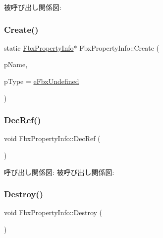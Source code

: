 被呼び出し関係図\+:
\mbox{\label{class_fbx_property_info_a8cf0ec9c51968ff02688038fe93de49a}} 
\subsubsection{\texorpdfstring{Create()}{Create()}\hspace{0.1cm}{\footnotesize\ttfamily [2/2]}}
{\footnotesize\ttfamily static \hyperlink{class_fbx_property_info}{Fbx\+Property\+Info}$\ast$ Fbx\+Property\+Info\+::\+Create (\begin{DoxyParamCaption}\item[{const char $\ast$}]{p\+Name,  }\item[{\hyperlink{fbxpropertytypes_8h_a73913a5ddfb20e57c6f25e9e6784bd92}{E\+Fbx\+Type}}]{p\+Type = {\ttfamily \hyperlink{fbxpropertytypes_8h_a73913a5ddfb20e57c6f25e9e6784bd92a150b400dddd0f8b5c7e22a1bba0721d8}{e\+Fbx\+Undefined}} }\end{DoxyParamCaption})\hspace{0.3cm}{\ttfamily [static]}}

\mbox{\label{class_fbx_property_info_abea3d3ce25a205502657711eb7e2c6f2}} 
\subsubsection{\texorpdfstring{Dec\+Ref()}{DecRef()}}
{\footnotesize\ttfamily void Fbx\+Property\+Info\+::\+Dec\+Ref (\begin{DoxyParamCaption}{ }\end{DoxyParamCaption})}

呼び出し関係図\+:
被呼び出し関係図\+:
\mbox{\label{class_fbx_property_info_a8d507d411ed1695e545fbae824cf3843}} 
\subsubsection{\texorpdfstring{Destroy()}{Destroy()}}
{\footnotesize\ttfamily void Fbx\+Property\+Info\+::\+Destroy (\begin{DoxyParamCaption}{ }\end{DoxyParamCaption})}

